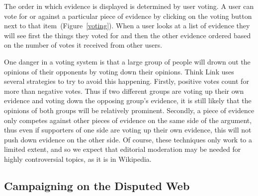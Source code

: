 \documentclass{chi2009}
\newcommand{\todo}[1]{}
\begin{document}
The order in which evidence is displayed is determined by user voting. A user can vote for or against a particular piece of evidence by clicking on the voting button next to that item~(Figure~\ref{voting}). When a user looks at a list of evidence they will see first the things they voted for and then the other evidence ordered based on the number of votes it received from other users.

One danger in a voting system is that a large group of people will drown out the opinions of their opponents by voting down their opinions. Think Link uses several strategies to try to avoid this happening. Firstly, positive votes count for more than negative votes. Thus if two different groups are voting up their own evidence and voting down the opposing group's evidence, it is still likely that the opinions of both groups will be relatively prominent. Secondly, a piece of evidence only competes against other pieces of evidence on the same side of the argument, thus even if supporters of one side are voting up their own evidence, this will not push down evidence on the other side. Of course, these techniques only work to a limited extent, and so we expect that editorial moderation may be needed for highly controversial topics, as it is in Wikipedia.

\todo{Talk about searches}
\todo{Cite work on collaborative filtering}
\todo{Mention the sidebar?}


\subsection{Campaigning on the Disputed Web}
\end{document}
